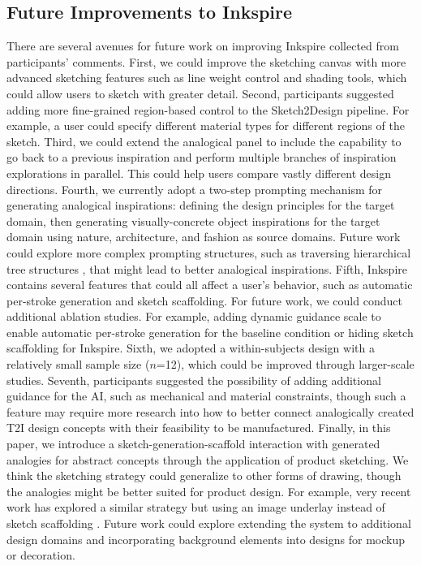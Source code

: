 \documentclass[sigconf, screen]{acmart}
\newcommand{\rev}[1] {{#1}}
\begin{document}

\label{section:limitations}
\subsection{Future Improvements to Inkspire}
There are several avenues for future work on improving Inkspire collected from participants' comments.
First, we could improve the sketching canvas with more advanced sketching features such as line weight control and shading tools, which could allow users to sketch with greater detail. 
Second, participants suggested adding more fine-grained region-based control to the Sketch2Design pipeline. 
For example, a user could specify different material types for different regions of the sketch. 
Third, we could extend the analogical panel to include the capability to go back to a previous inspiration and perform multiple branches of inspiration explorations in parallel. This could help users compare vastly different design directions.
Fourth, we currently adopt a two-step prompting mechanism for generating analogical inspirations: defining the design principles for the target domain, then generating visually-concrete object inspirations for the target domain using nature, architecture, and fashion as source domains.
Future work could explore more complex prompting structures, such as traversing hierarchical tree structures \cite{kang2023biospark}, that might lead to better analogical inspirations.
\rev{Fifth, Inkspire contains several features that could all affect a user's behavior, such as automatic per-stroke generation and sketch scaffolding.
For future work, we could conduct additional ablation studies. For example, adding dynamic guidance scale to enable automatic per-stroke generation for the baseline condition or hiding sketch scaffolding for Inkspire.}
Sixth, we adopted a within-subjects design with a relatively small sample size ($n$=12), which could be improved through larger-scale studies.
Seventh, participants suggested the possibility of adding additional guidance for the AI, such as mechanical and material constraints, though such a feature may require more research into how to better connect analogically created T2I design concepts with their feasibility to be manufactured.
Finally, in this paper, we introduce a sketch-generation-scaffold interaction with generated analogies for abstract concepts through the application of product sketching. We think the sketching strategy could generalize to other forms of drawing, though the analogies might be better suited for product design.
For example, very recent work has explored a similar strategy but using an image underlay instead of sketch scaffolding \cite{sarukkai2024block}.
Future work could explore extending the system to additional design domains and incorporating background elements into designs for mockup or decoration.
\end{document}
